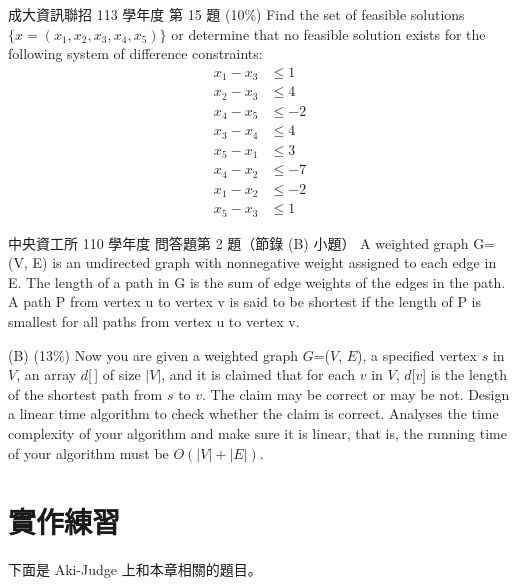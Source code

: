 \begin{pastexam}[label={px:spt-4}]{成大資訊聯招 113 學年度 第 15 題}
(10\%) Find the set of feasible solutions $\{x=(x_1,x_2,x_3,x_4,x_5)\}$ or determine that no
feasible solution exists for the following system of difference constraints:
\begin{align*}
x_1-x_3&\le 1\\
x_2-x_3&\le 4\\
x_4-x_5&\le -2\\
x_3-x_4&\le 4\\
x_5-x_1&\le 3\\
x_4-x_2&\le -7\\
x_1-x_2&\le -2\\
x_5-x_3&\le 1
\end{align*}
\end{pastexam}

\begin{pastexam}[label={px:spt-5}]{中央資工所 110 學年度 問答題第 2 題（節錄 (B) 小題）}
A weighted graph G=(V, E) is an undirected graph with nonnegative weight assigned to each edge in
E. The length of a path in G is the sum of edge weights of the edges in the path. A path P from
vertex u to vertex v is said to be shortest if the length of P is smallest for all paths from
vertex u to vertex v.

(B) (13\%) Now you are given a weighted graph $G$=($V$, $E$), a specified vertex $s$ in $V$, an
array $d$[\,] of size $|V|$, and it is claimed that for each $v$ in $V$, $d$[$v$] is the length of
the shortest path from $s$ to $v$. The claim may be correct or may be not. Design a linear time
algorithm to check whether the claim is correct. Analyses the time complexity of your algorithm
and make sure it is linear, that is, the running time of your algorithm must be
$O(|V|+|E|)$.
\end{pastexam}

\section{實作練習}
\label{sec:spt-practice}

下面是 Aki-Judge 上和本章相關的題目。

